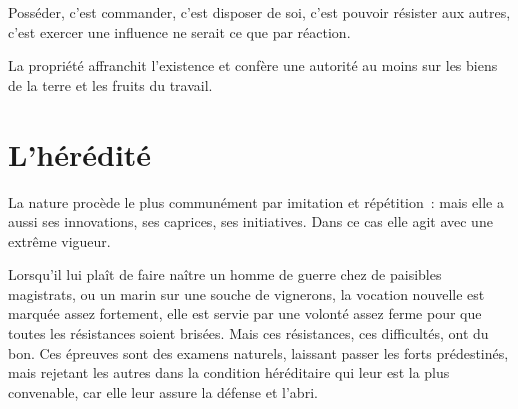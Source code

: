\documentclass[french,twoside]{book} %
\newcommand{\astermono}{\medskip\centerline{\color{rubric}\large\selectfont{\syms ✻}}\medskip\par}%
\begin{document}
\astermono

\noindent Posséder, c’est commander, c’est disposer de soi, c’est pouvoir résister aux autres, c’est exercer une influence ne serait ce que par réaction.\par
La propriété affranchit l’existence et confère une autorité au moins sur les biens de la terre et les fruits du travail.
\section[{L’hérédité}]{L’hérédité}
\noindent La nature procède le plus communément par imitation et répétition : mais elle a aussi ses innovations, ses caprices, ses initiatives. Dans ce cas elle agit avec une extrême vigueur.\par
Lorsqu’il lui plaît de faire naître un homme de guerre chez de paisibles magistrats, ou un marin sur une souche de vignerons, la vocation nouvelle est marquée assez fortement, elle est servie par une volonté assez ferme pour que toutes les résistances soient brisées. Mais ces résistances, ces difficultés, ont du bon. Ces épreuves sont des examens naturels, laissant passer les forts prédestinés, mais rejetant les autres dans la condition héréditaire qui leur est la plus convenable, car elle leur assure la défense et l’abri.\par

\astermono
\end{document}
